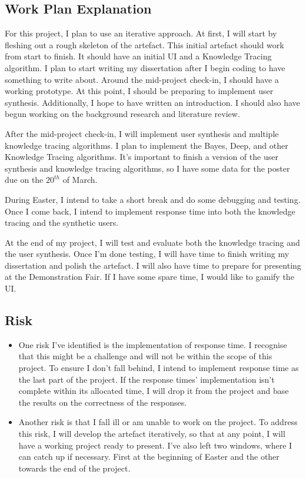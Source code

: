 \documentclass[11pt]{article}
\begin{document}
\subsection{Work Plan Explanation}

For this project, I plan to use an iterative approach. At first, I will start by fleshing out a rough skeleton of the artefact. This initial artefact should work from start to finish. It should have an initial UI and a Knowledge Tracing algorithm. I plan to start writing my dissertation after I begin coding to have something to write about. Around the mid-project check-in, I should have a working prototype. At this point, I should be preparing to implement user synthesis. Additionally, I hope to have written an introduction. I should also have begun working on the background research and literature review.

After the mid-project check-in, I will implement user synthesis and multiple knowledge tracing algorithms. I plan to implement the Bayes, Deep, and other Knowledge Tracing algorithms. It's important to finish a version of the user synthesis and knowledge tracing algorithms, so I have some data for the poster due on the $20^{th}$ of March.

During Easter, I intend to take a short break and do some debugging and testing. Once I come back, I intend to implement response time into both the knowledge tracing and the synthetic users.

At the end of my project, I will test and evaluate both the knowledge tracing and the user synthesis. Once I'm done testing, I will have time to finish writing my dissertation and polish the artefact. I will also have time to prepare for presenting at the Demonstration Fair. If I have some spare time, I would like to gamify the UI\@.

\subsection{Risk}
\begin{itemize}
    \item One risk I've identified is the implementation of response time. I recognise that this might be a challenge and will not be within the scope of this project. To ensure I don't fall behind, I intend to implement response time as the last part of the project. If the response times' implementation isn't complete within its allocated time, I will drop it from the project and base the results on the correctness of the responses.
    \item Another risk is that I fall ill or am unable to work on the project. To address this risk, I will develop the artefact iteratively, so that at any point, I will have a working project ready to present. I've also left two windows, where I can catch up if necessary. First at the beginning of Easter and the other towards the end of the project.
\end{itemize}

\newpage
\printbibliography{}
\end{document}
